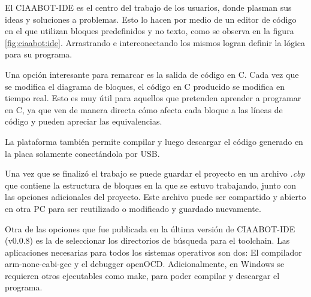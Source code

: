 El CIAABOT-IDE es el centro del trabajo de los usuarios, donde plasman sus ideas y soluciones a problemas. Esto lo hacen por medio de un editor de código en el que utilizan bloques predefinidos y no texto, como se observa en la figura \ref{fig:ciaabot:ide}. Arrastrando e interconectando los mismos logran definir la lógica para su programa.

Una opción interesante para remarcar es la salida de código en C. Cada vez que se modifica el diagrama de bloques, el código en C producido se modifica en tiempo real. Esto es muy útil para aquellos que pretenden aprender a programar en C, ya que ven de manera directa cómo afecta cada bloque a las líneas de código y pueden apreciar las equivalencias.

La plataforma también permite compilar y luego descargar el código generado en la placa solamente conectándola por USB.

Una vez que se finalizó el trabajo se puede guardar el proyecto en un archivo \emph{.cbp} que contiene la estructura de bloques en la que se estuvo trabajando, junto con las opciones adicionales del proyecto. Este archivo puede ser compartido y abierto en otra PC para ser reutilizado o modificado y guardado nuevamente.

Otra de las opciones que fue publicada en la última versión de CIAABOT-IDE (v0.0.8) es la de seleccionar los directorios de búsqueda para el toolchain. Las aplicaciones necesarias para todos los sistemas operativos son dos: El compilador arm-none-eabi-gcc y el debugger openOCD. Adicionalmente, en Windows se requieren otros ejecutables como make, para poder compilar y descargar el programa.

